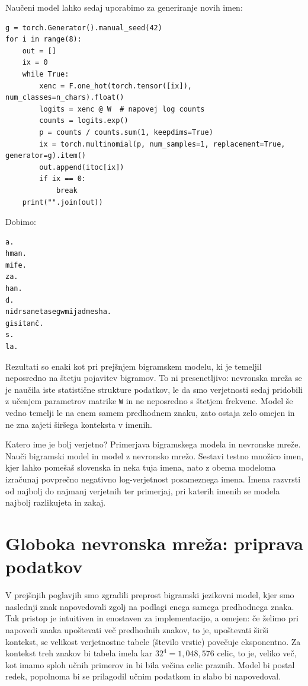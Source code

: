 Naučeni model lahko sedaj uporabimo za generiranje novih imen:
%
\vspace*{3mm}
\begin{lstlisting}
g = torch.Generator().manual_seed(42)
for i in range(8):
    out = []
    ix = 0
    while True:
        xenc = F.one_hot(torch.tensor([ix]), num_classes=n_chars).float()
        logits = xenc @ W  # napovej log counts
        counts = logits.exp()
        p = counts / counts.sum(1, keepdims=True)
        ix = torch.multinomial(p, num_samples=1, replacement=True, generator=g).item()
        out.append(itoc[ix])
        if ix == 0:
            break
    print("".join(out))
\end{lstlisting}

Dobimo:
%
\vspace*{3mm}
\begin{lstlisting}
a.
hman.
mife.
za.
han.
d.
nidrsanetasegwmijadmesha.
gisitanč.
s.
la.
\end{lstlisting}

Rezultati so enaki kot pri prejšnjem bigramskem modelu, ki je temeljil neposredno na štetju pojavitev bigramov. 
%
%
To ni presenetljivo: nevronska mreža se je naučila iste statistične strukture podatkov, le da smo verjetnosti sedaj pridobili z učenjem parametrov matrike \texttt{W} in ne neposredno s štetjem frekvenc. Model še vedno temelji le na enem samem predhodnem znaku, zato ostaja zelo omejen in ne zna zajeti širšega konteksta v imenih.

\begin{exercise}{Katero ime je bolj verjetno? Primerjava bigramskega modela in nevronske mreže.}
Nauči bigramski model in model z nevronsko mrežo. Sestavi testno množico imen, 
kjer lahko pomešaš slovenska in neka tuja imena, nato z obema modeloma 
izračunaj povprečno negativno log-verjetnost posameznega imena. Imena razvrsti 
od najbolj do najmanj verjetnih ter primerjaj, pri katerih imenih se modela
najbolj razlikujeta in zakaj.
\end{exercise}

\section{Globoka nevronska mreža: priprava podatkov}

V prejšnjih poglavjih smo zgradili preprost bigramski jezikovni model, kjer smo naslednji znak napovedovali zgolj na podlagi enega samega predhodnega znaka. Tak pristop je intuitiven in enostaven za implementacijo, a omejen: če želimo pri napovedi znaka upoštevati več predhodnih znakov, to je, upoštevati širši kontekst, se velikost verjetnostne tabele (število vrstic) povečuje eksponentno. Za kontekst treh znakov bi tabela imela kar $32^4=1,048,576$ celic, to je, veliko več, kot imamo sploh učnih primerov in bi bila večina celic praznih. Model bi postal redek, popolnoma bi se prilagodil učnim podatkom in slabo bi napovedoval.

